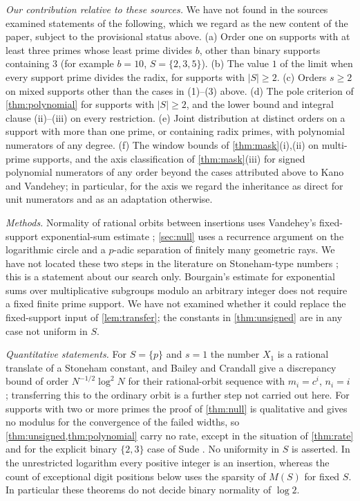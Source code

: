 \documentclass[11pt]{article}
\begin{document}
\emph{Our contribution relative to these sources.} We have not found in the sources examined statements of the following, which we regard as the new content of the paper, subject to the provisional status above. (a) Order one on supports with at least three primes whose least prime divides $b$, other than binary supports containing $3$ (for example $b=10$, $S=\{2,3,5\}$). (b) The value $1$ of the limit when every support prime divides the radix, for supports with $|S|\ge2$. (c) Orders $s\ge2$ on mixed supports other than the cases in (1)--(3) above. (d) The pole criterion of \cref{thm:polynomial} for supports with $|S|\ge2$, and the lower bound and integral clause (ii)--(iii) on every restriction. (e) Joint distribution at distinct orders on a support with more than one prime, or containing radix primes, with polynomial numerators of any degree. (f) The window bounds of \cref{thm:mask}(i),(ii) on multi-prime supports, and the axis classification of \cref{thm:mask}(iii) for signed polynomial numerators of any order beyond the cases attributed above to Kano and Vandehey; in particular, for the axis we regard the inheritance as direct for unit numerators and as an adaptation otherwise.

\emph{Methods.} Normality of rational orbits between insertions uses Vandehey's fixed-support exponential-sum estimate \cite[Corollary~1.2]{vandehey}; \cref{sec:null} uses a recurrence argument on the logarithmic circle and a $p$-adic separation of finitely many geometric rays. We have not located these two steps in the literature on Stoneham-type numbers \cite{bc,kano,korobov,vandehey}; this is a statement about our search only. Bourgain's estimate for exponential sums over multiplicative subgroups modulo an arbitrary integer \cite[Theorem~8.28, as restated in Theorem~2.5 of \cite{vandehey}]{bourgain} does not require a fixed finite prime support. We have not examined whether it could replace the fixed-support input of \cref{lem:transfer}; the constants in \cref{thm:unsigned} are in any case not uniform in $S$.

\emph{Quantitative statements.} For $S=\{p\}$ and $s=1$ the number $X_1$ is a rational translate of a Stoneham constant, and Bailey and Crandall give a discrepancy bound of order $N^{-1/2}\log^2N$ for their rational-orbit sequence with $m_i=c^i$, $n_i=i$ \cite[p.~535]{bc}; transferring this to the ordinary orbit is a further step not carried out here. For supports with two or more primes the proof of \cref{thm:null} is qualitative and gives no modulus for the convergence of the failed widths, so \cref{thm:unsigned,thm:polynomial} carry no rate, except in the situation of \cref{thm:rate} and for the explicit binary $\{2,3\}$ case of Sude \cite{localized}. No uniformity in $S$ is asserted. In the unrestricted logarithm every positive integer is an insertion, whereas the count of exceptional digit positions below uses the sparsity of $M(S)$ for fixed $S$. In particular these theorems do not decide binary normality of $\log2$.
\end{document}
